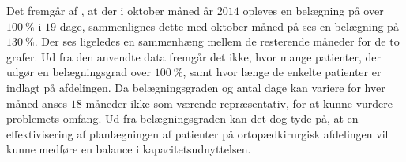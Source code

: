 \noindent
Det fremgår af , at der i oktober måned år $2014$ opleves en belægning på over $100~\%$ i $19$ dage, sammenlignes dette med oktober måned på  ses en belægning på $130~\%$. Der ses ligeledes en sammenhæng mellem de resterende måneder for de to grafer. 
Ud fra den anvendte data fremgår det ikke, hvor mange patienter, der udgør en belægningsgrad over $100~\%$, samt hvor længe de enkelte patienter er indlagt på afdelingen. Da belægningsgraden og antal dage kan variere for hver måned anses $18$ måneder ikke som værende repræsentativ, for at kunne vurdere problemets omfang. Ud fra belægningsgraden kan det dog tyde på, at en effektivisering af planlægningen af patienter på ortopædkirurgisk afdelingen vil kunne medføre en balance i kapacitetsudnyttelsen.